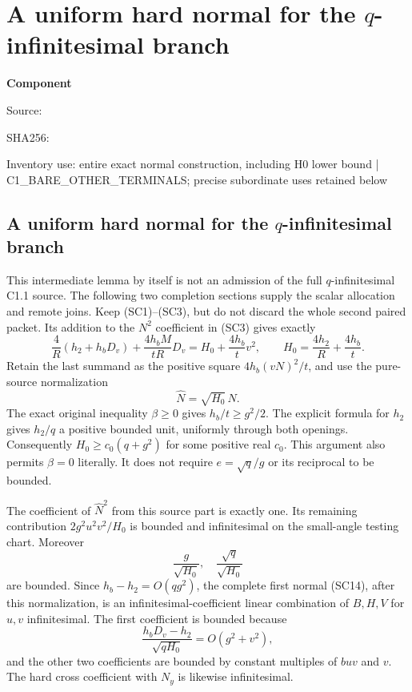 \chapter{A uniform hard normal for the $q$-infinitesimal branch}
\label{component:p7d43f3fccb7d}
\noindent\textbf{Component }\par
{\small\noindent Source: \par}
{\small\noindent SHA256: \par}
{\small\noindent Inventory use: entire exact normal construction, including H0 lower bound | C1\_\allowbreak{}BARE\_\allowbreak{}OTHER\_\allowbreak{}TERMINALS; precise subordinate uses retained below\par}
\medskip
\section[A uniform hard normal for the q-infinitesimal branch]{A uniform hard normal for the $q$-infinitesimal branch}
This intermediate lemma by itself is not an admission of the full
$q$-infinitesimal C1.1 source. The following two completion sections
supply the scalar allocation and remote joins. Keep (SC1)--(SC3), but do
not discard the whole second paired packet. Its addition to the
$N^2$ coefficient in (SC3) gives exactly
\[
 \frac4R(h_2+h_bD_v)+\frac{4h_bM}{tR}D_v
       =H_0+\frac{4h_b}{t}v^2,
 \qquad H_0=\frac{4h_2}{R}+\frac{4h_b}{t}.
\]
Retain the last summand as the positive square
$4h_b(vN)^2/t$, and use the pure-source normalization
\[
                         \widehat N=\sqrt{H_0}\,N.
\]
The exact original inequality $\beta\ge0$ gives
$h_b/t\ge g^2/2$. The explicit formula for $h_2$ gives
$h_2/q$ a positive bounded unit, uniformly through both openings.
Consequently $H_0\ge c_0(q+g^2)$ for some positive real $c_0$.
This argument also permits $\beta=0$ literally. It does not require
$e=\sqrt q/g$ or its reciprocal to be bounded.

The coefficient of $\widehat N^2$ from this source part is exactly
one. Its remaining contribution $2g^2u^2v^2/H_0$ is bounded and
infinitesimal on the small-angle testing chart. Moreover
\[
 \frac{g}{\sqrt{H_0}},\quad
 \frac{\sqrt q}{\sqrt{H_0}}
\]
are bounded. Since $h_b-h_2=O(qg^2)$, the complete first normal
(SC14), after this normalization, is an infinitesimal-coefficient
linear combination of $B,H,V$ for $u,v$ infinitesimal. The first
coefficient is bounded because
\[
 \frac{h_bD_v-h_2}{\sqrt{qH_0}}
            =O(g^2+v^2),
\]
and the other two coefficients are bounded by constant multiples of
$buv$ and $v$. The hard cross coefficient with $N_y$ is likewise
infinitesimal.

